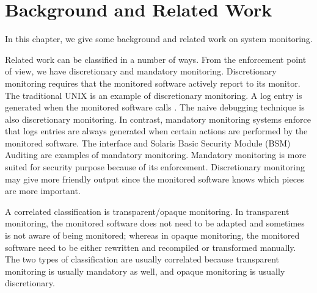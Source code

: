 \section{Background and Related Work}

In this chapter, we give some background and related work on system monitoring.


Related work can be classified in a number of ways.
From the enforcement point of view, we have discretionary and
mandatory monitoring.
Discretionary monitoring requires that the monitored software
actively report to its monitor.
The traditional UNIX  is an example of discretionary monitoring.
A log entry is generated when the monitored software calls .
The naive  debugging technique is also discretionary monitoring.
In contrast, mandatory monitoring systems enforce that logs entries are always
generated when certain actions are performed by the monitored software.
The  interface and Solaris Basic Security Module (BSM) Auditing
are examples of mandatory monitoring.
Mandatory monitoring is more suited for security purpose because of its enforcement.
Discretionary monitoring may give more friendly output since the monitored
software knows which pieces are more important.

A correlated classification is transparent/opaque monitoring.
In transparent monitoring, the monitored software does not need to be adapted
and sometimes is not aware of being monitored;
whereas in opaque monitoring, the monitored software need to be either
rewritten and recompiled or transformed manually.
The two types of classification are usually correlated because transparent monitoring
is usually mandatory as well, and opaque monitoring is usually discretionary.

